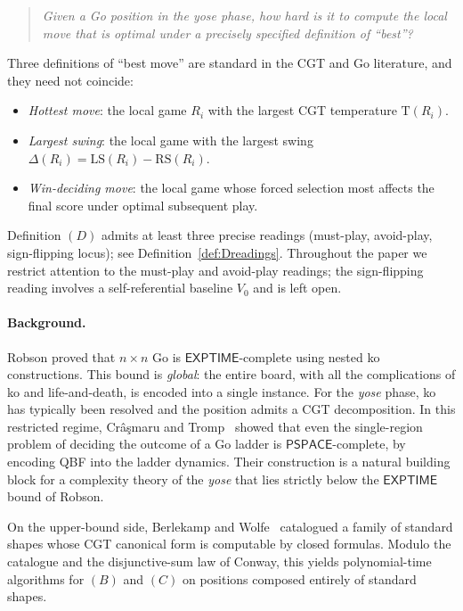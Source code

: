 \documentclass[11pt,a4paper]{amsart}
\theoremstyle{definition}
\theoremstyle{remark}
\newcommand{\LS}{\mathrm{LS}}
\newcommand{\RS}{\mathrm{RS}}
\newcommand{\Tt}{\mathrm{T}}
\newcommand{\PSPACE}{\mathsf{PSPACE}}
\begin{document}
\begin{quote}
\emph{Given a Go position in the yose phase, how hard is it to compute the
local move that is optimal under a precisely specified definition of
``best''?}
\end{quote}

Three definitions of ``best move'' are standard in the CGT and Go
literature, and they need not coincide:
\begin{itemize}[leftmargin=2em]
\item[$(B)$] \emph{Hottest move}: the local game $R_i$ with the largest
  CGT temperature $\Tt(R_i)$.
\item[$(C)$] \emph{Largest swing}: the local game with the largest swing
  $\Delta(R_i) = \LS(R_i) - \RS(R_i)$.
\item[$(D)$] \emph{Win-deciding move}: the local game whose forced
  selection most affects the final score under optimal subsequent play.
\end{itemize}

Definition $(D)$ admits at least three precise readings (must-play,
avoid-play, sign-flipping locus); see Definition~\ref{def:Dreadings}.
Throughout the paper we restrict attention to the must-play and avoid-play
readings; the sign-flipping reading involves a self-referential baseline
$V_0$ and is left open.

\paragraph{Background.}
Robson \cite{Robson1983} proved that $n \times n$ Go is
$\mathsf{EXPTIME}$-complete using nested ko constructions. This bound is
\emph{global}: the entire board, with all the complications of ko and
life-and-death, is encoded into a single instance. For the
\emph{yose} phase, ko has typically been resolved and the position
admits a CGT decomposition. In this restricted regime,
Cr\^{a}\c{s}maru and Tromp~\cite{CrasmaruTromp2000} showed that even the
single-region problem of deciding the outcome of a Go ladder is
$\PSPACE$-complete, by encoding QBF into the ladder dynamics. Their
construction is a natural building block for a complexity theory of the
\emph{yose} that lies strictly below the $\mathsf{EXPTIME}$ bound of
Robson.

On the upper-bound side, Berlekamp and Wolfe~\cite{BW1994} catalogued a
family of standard shapes whose CGT canonical form is computable by closed
formulas. Modulo the catalogue and the disjunctive-sum law of Conway, this
yields polynomial-time algorithms for $(B)$ and $(C)$ on positions
composed entirely of standard shapes.
\end{document}
